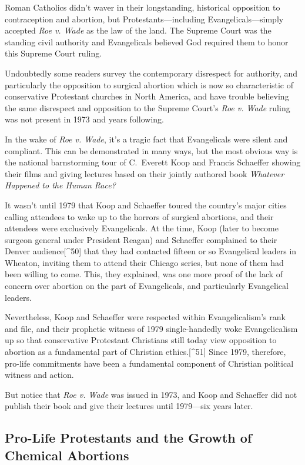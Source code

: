 \documentclass[
]{book}
\begin{document}
Roman Catholics didn't waver in their longstanding, historical opposition to contraception and abortion, but Protestants---including Evangelicals---simply accepted \emph{Roe v. Wade} as the law of the land. The Supreme Court was the standing civil authority and Evangelicals believed God required them to honor this Supreme Court ruling.

Undoubtedly some readers survey the contemporary disrespect for authority, and particularly the opposition to surgical abortion which is now so characteristic of conservative Protestant churches in North America, and have trouble believing the same disrespect and opposition to the Supreme Court's \emph{Roe v. Wade} ruling was not present in 1973 and years following.

In the wake of \emph{Roe v. Wade}, it's a tragic fact that Evangelicals were silent and compliant. This can be demonstrated in many ways, but the most obvious way is the national barnstorming tour of C.~Everett Koop and Francis Schaeffer showing their films and giving lectures based on their jointly authored book \emph{Whatever Happened to the Human Race?}

It wasn't until 1979 that Koop and Schaeffer toured the country's major cities calling attendees to wake up to the horrors of surgical abortions, and their attendees were exclusively Evangelicals. At the time, Koop (later to become surgeon general under President Reagan) and Schaeffer complained to their Denver audience{[}\^{}50{]} that they had contacted fifteen or so Evangelical leaders in Wheaton, inviting them to attend their Chicago series, but none of them had been willing to come. This, they explained, was one more proof of the lack of concern over abortion on the part of Evangelicals, and particularly Evangelical leaders.

Nevertheless, Koop and Schaeffer were respected within Evangelicalism's rank and file, and their prophetic witness of 1979 single-handedly woke Evangelicalism up so that conservative Protestant Christians still today view opposition to abortion as a fundamental part of Christian ethics.{[}\^{}51{]} Since 1979, therefore, pro-life commitments have been a fundamental component of Christian political witness and action.

But notice that \emph{Roe v. Wade} was issued in 1973, and Koop and Schaeffer did not publish their book and give their lectures until 1979---six years later.

\hypertarget{pro-life-protestants-and-the-growth-of-chemical-abortions}{%
\subsection{Pro-Life Protestants and the Growth of Chemical Abortions}\label{pro-life-protestants-and-the-growth-of-chemical-abortions}}
\end{document}
